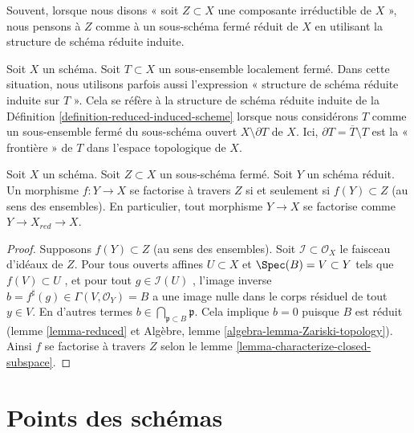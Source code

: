 \noindent
Souvent, lorsque nous disons « soit  $Z \subset X$  une composante irréductible de
 $X$ », nous pensons à  $Z$  comme à un sous-schéma fermé réduit de
 $X$  en utilisant la structure de schéma réduite induite.

\begin{remark}
\label{remark-reduced-induced-locally-closed}
Soit  $X$  un schéma. Soit  $T \subset X$  un sous-ensemble localement fermé.
Dans cette situation, nous utilisons parfois aussi l'expression « structure de
schéma réduite induite sur  $T$ ». Cela se réfère à la structure de schéma
réduite induite de la Définition  \ref{definition-reduced-induced-scheme}  lorsque nous considérons  $T$ 
comme un sous-ensemble fermé du sous-schéma ouvert  $X \setminus \partial T$  de  $X$.
Ici,  $\partial T = \overline{T} \setminus T$  est la « frontière » de  $T$  dans l'espace topologique
de  $X$.
\end{remark}

\begin{lemma}
\label{lemma-map-into-reduction}
Soit  $X$  un schéma. Soit  $Z \subset X$  un sous-schéma fermé. Soit
 $Y$  un schéma réduit. Un morphisme  $f : Y \to X$  se factorise à travers
 $Z$  si et seulement si  $f(Y) \subset Z$  (au sens des ensembles). En
particulier, tout morphisme  $Y \to X$  se factorise comme  $Y \to X_{red} \to X$.
\end{lemma}

\begin{proof}
Supposons  $f(Y) \subset Z$  (au sens des ensembles). Soit  $\mathcal{I} \subset \mathcal{O}_X$  le faisceau
d'idéaux de  $Z$. Pour tous ouverts affines  $U \subset X$  et  $\Spec(B) = V \subset Y$  tels que
 $f(V) \subset U$ , et pour tout  $g \in \mathcal{I}(U)$ , l'image inverse  $b = f^\sharp(g) \in \Gamma(V, \mathcal{O}_Y) = B$  a une image
nulle dans le corps résiduel de tout  $y \in V$. En d'autres termes  $b \in \bigcap_{\mathfrak p \subset B} \mathfrak p$.
Cela implique  $b = 0$  puisque  $B$  est réduit (lemme  \ref{lemma-reduced} et
Algèbre, lemme  \ref{algebra-lemma-Zariski-topology}). Ainsi  $f$  se factorise à travers
 $Z$  selon le lemme  \ref{lemma-characterize-closed-subspace}.
\end{proof}










\section{Points des schémas}
\label{section-points}

